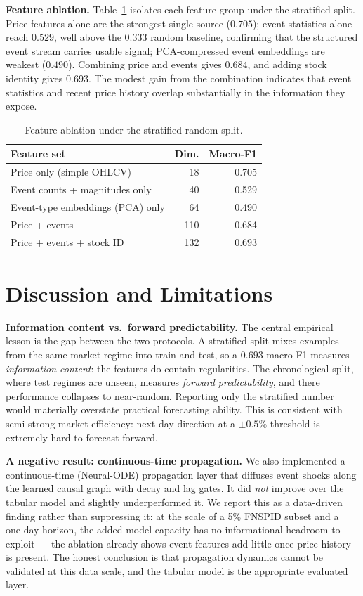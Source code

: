 \documentclass[sigconf,nonacm]{acmart}
\begin{document}
\textbf{Feature ablation.} Table~\ref{tab:ablation} isolates each feature
group under the stratified split. Price features alone are the strongest
single source ($0.705$); event statistics alone reach $0.529$, well above
the $0.333$ random baseline, confirming that the structured event stream
carries usable signal; PCA-compressed event embeddings are weakest
($0.490$). Combining price and events gives $0.684$, and adding stock
identity gives $0.693$. The modest gain from the combination indicates
that event statistics and recent price history overlap substantially in
the information they expose.

\begin{table}[t]
\caption{Feature ablation under the stratified random split.}
\label{tab:ablation}
\begin{tabular}{lrr}
\toprule
Feature set & Dim. & Macro-F1 \\
\midrule
Price only (simple OHLCV)        & \phantom{0}18 & 0.705 \\
Event counts + magnitudes only   & \phantom{0}40 & 0.529 \\
Event-type embeddings (PCA) only & \phantom{0}64 & 0.490 \\
Price + events                   & 110 & 0.684 \\
Price + events + stock ID        & 132 & 0.693 \\
\bottomrule
\end{tabular}
\end{table}

\section{Discussion and Limitations}
\label{sec:discussion}
\textbf{Information content vs.\ forward predictability.} The central
empirical lesson is the gap between the two protocols. A stratified split
mixes examples from the same market regime into train and test, so a
$0.693$ macro-F1 measures \emph{information content}: the features do
contain regularities. The chronological split, where test regimes are
unseen, measures \emph{forward predictability}, and there performance
collapses to near-random. Reporting only the stratified number would
materially overstate practical forecasting ability. This is consistent
with semi-strong market efficiency: next-day direction at a
$\pm0.5\%$ threshold is extremely hard to forecast forward.

\textbf{A negative result: continuous-time propagation.} We also
implemented a continuous-time (Neural-ODE) propagation layer that
diffuses event shocks along the learned causal graph with decay and
lag gates. It did \emph{not} improve over the tabular model and slightly
underperformed it. We report this as a data-driven finding rather than
suppressing it: at the scale of a 5\% FNSPID subset and a one-day
horizon, the added model capacity has no informational headroom to
exploit --- the ablation already shows event features add little once
price history is present. The honest conclusion is that propagation
dynamics cannot be validated at this data scale, and the tabular model is
the appropriate evaluated layer.
\end{document}
